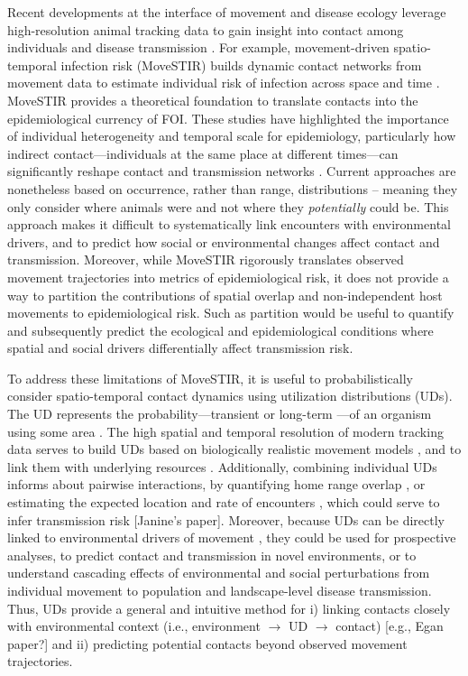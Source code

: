 \documentclass[letterpaper]{article}
\begin{document}
Recent developments at the interface of movement and disease ecology leverage high-resolution animal tracking data to gain insight into contact among individuals and disease transmission \citep{Richardson2015,Wilber2022,Yang2023}. For example, movement-driven spatio-temporal infection risk (MoveSTIR) builds dynamic contact networks from movement data to estimate individual risk of infection across space and time \citep{Wilber2022}. MoveSTIR provides a theoretical foundation to translate contacts into the epidemiological currency of FOI. These studies have highlighted the importance of individual heterogeneity and temporal scale for epidemiology, particularly how indirect contact---individuals at the same place at different times---can significantly reshape contact and transmission networks \citep{Richardson2015,Yang2023}. Current approaches are nonetheless based on occurrence, rather than range, distributions \citep[in the terminology of ][]{Alston2022} -- meaning they only consider where animals were and not where they \emph{potentially} could be. This approach makes it difficult to systematically link encounters with environmental drivers, and to predict how social or environmental changes affect contact and transmission.  Moreover, while MoveSTIR rigorously translates observed movement trajectories into metrics of epidemiological risk, it does not provide a way to partition the contributions of spatial overlap and non-independent host movements to epidemiological risk. Such as partition would be useful to quantify and subsequently predict the ecological and epidemiological conditions where spatial and social drivers differentially affect transmission risk.

To address these limitations of MoveSTIR, it is useful to probabilistically consider spatio-temporal contact dynamics using utilization distributions (UDs). The UD represents the probability---transient or long-term \citep{Tao2016}---of an organism using some area \citep{Worton1989}. The high spatial and temporal resolution of modern tracking data serves to build UDs based on biologically realistic movement models \citep{Kranstauber2012,Fleming2014}, and to link them with underlying resources \citep{Potts2023}.
Additionally, combining individual UDs informs about pairwise interactions, by quantifying home range overlap \citep{Winner2018}, or estimating the expected location and rate of encounters \citep{Noonan2021}, which could serve to infer transmission risk \citep{Godfrey2010,Godfrey2013,Noonan2021} [Janine's paper]. 
Moreover, because UDs can be directly linked to environmental drivers of movement \citep{Signer2017}, they could be used for prospective analyses, to predict contact and transmission in novel environments, or to understand cascading effects of environmental and social perturbations from individual movement to population and landscape-level disease transmission.  Thus, UDs provide a general and intuitive method for i) linking contacts closely with environmental context (i.e., environment $\rightarrow$ UD $\rightarrow$ contact) [e.g., Egan paper?] and ii) predicting potential contacts beyond observed movement trajectories.
\end{document}
